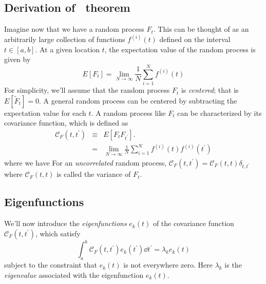\subsection{Derivation of \KL\ theorem}
Imagine now that we have a random process $F_t$.  This can be thought of as
an arbitrarily large collection of functions $f^{(i)}(t)$ defined
on the interval
$t \in [a, b]$.  At a given location $t$, the expectation value of the
random process is given by
\begin{equation}
  E[F_t] = \lim_{N \to \infty} \frac{1}{N} \sum_{i=1}^N f^{(i)}(t)
\end{equation}
For simplicity, we'll assume that the random process $F_t$ is {\it
centered}; that is $E[\tilde{F}_t] = 0$.  A general random process can be
centered by subtracting the expectation value for each $t$.
A random process like $F_t$ can be characterized
by its covariance function, which is defined as
\begin{eqnarray}
  \label{eq:corrfunc_def}
  \mathcal{C}_F(t, t^\prime) &\equiv& E[F_t F_{t^\prime}].
  \nonumber\\
  &=& \lim_{N\to\infty}\frac{1}{N} \sum_{i=1}^N
  f^{(i)}(t)f^{(i)}(t^\prime)
\end{eqnarray}
where we have 
For an {\it uncorrelated} random process,
$\mathcal{C}_F(t, t^\prime) = \mathcal{C}_F(t, t) \delta_{t, t^\prime}$
where $\mathcal{C}_F(t, t) $ is called the variance of $F_t$.

\subsection{Eigenfunctions}
We'll now introduce the {\it eigenfunctions} $e_k(t)$
of the covariance function $\mathcal{C}_F(t, t^\prime)$, which satisfy
\begin{equation}
  \label{eq:eigfunc_def}
  \int_a^b \mathcal{C}_F(t, t^\prime) e_k(t^\prime)\dd t^\prime
  = \lambda_k e_k(t)
\end{equation}
subject to the constraint that $e_k(t)$ is not everywhere zero.
Here $\lambda_k$ is the {\it eigenvalue} associated with the
eigenfunction $e_k(t)$.

